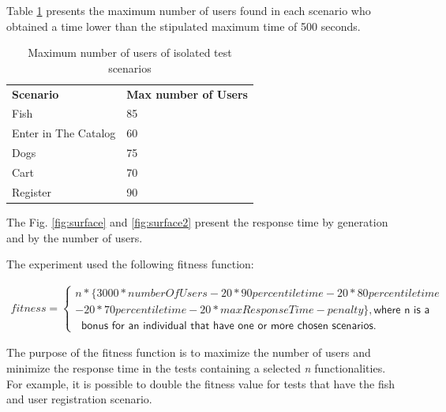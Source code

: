 \documentclass{bmcart}
\begin{document}
Table \ref{tab:isolated} presents the maximum number of users found in each scenario who obtained a time lower than the stipulated maximum time of 500 seconds.


\begin{table}[h!]
\centering
\caption{Maximum number of users of isolated test scenarios }
\label{tab:isolated}
\begin{tabular}{ll}
\rowcolor[HTML]{FFCCC9} 
\textbf{Scenario}    & \textbf{Max number of Users} \\
Fish                 & 85                           \\
Enter in The Catalog & 60                           \\
Dogs                 & 75                           \\
Cart                 & 70                           \\
Register             & 90                          
\end{tabular}
\end{table}

The Fig. \ref{fig:surface} and \ref{fig:surface2} present the response time by generation and by the number of users.



The experiment used the following fitness function:

\begin{equation}
\begin{aligned}
fitness=\begin{cases} n*\{3000*numberOfUsers-20* 90percentiletime-20*80percentiletime\\-20*70percentiletime
-20*maxResponseTime-penalty\} , \textsf{where n is a }\\\ \textsf{ bonus for an individual that have one or more chosen scenarios.} 
\end{cases}
\end{aligned}
\end{equation}


The purpose of the fitness function is to maximize the number of users and minimize the response time in the tests containing a selected \textit{n} functionalities. For example, it is possible to double the fitness value for tests that have the fish and user registration scenario. 
\end{document}
